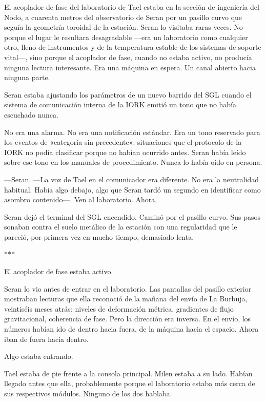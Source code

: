\documentclass[11pt,a5paper,twoside]{book}
\begin{document}
El acoplador de fase del laboratorio de Tael estaba en la sección de ingeniería del Nodo, a cuarenta metros del observatorio de Seran por un pasillo curvo que seguía la geometría toroidal de la estación. Seran lo visitaba raras veces. No porque el lugar le resultara desagradable —era un laboratorio como cualquier otro, lleno de instrumentos y de la temperatura estable de los sistemas de soporte vital—, sino porque el acoplador de fase, cuando no estaba activo, no producía ninguna lectura interesante. Era una máquina en espera. Un canal abierto hacia ninguna parte.

Seran estaba ajustando los parámetros de un nuevo barrido del SGL cuando el sistema de comunicación interna de la IORK emitió un tono que no había escuchado nunca.

No era una alarma. No era una notificación estándar. Era un tono reservado para los eventos de «categoría sin precedente»: situaciones que el protocolo de la IORK no podía clasificar porque no habían ocurrido antes. Seran había leído sobre ese tono en los manuales de procedimiento. Nunca lo había oído en persona.

—Seran. —La voz de Tael en el comunicador era diferente. No era la neutralidad habitual. Había algo debajo, algo que Seran tardó un segundo en identificar como asombro contenido—. Ven al laboratorio. Ahora.

Seran dejó el terminal del SGL encendido. Caminó por el pasillo curvo. Sus pasos sonaban contra el suelo metálico de la estación con una regularidad que le pareció, por primera vez en mucho tiempo, demasiado lenta.

\vspace{1.5em}
\begin{center}$\ast$\quad$\ast$\quad$\ast$\end{center}
\vspace{1.5em}

El acoplador de fase estaba activo.

Seran lo vio antes de entrar en el laboratorio. Las pantallas del pasillo exterior mostraban lecturas que ella reconoció de la mañana del envío de La Burbuja, veintiséis meses atrás: niveles de deformación métrica, gradientes de flujo gravitacional, coherencia de fase. Pero la dirección era inversa. En el envío, los números habían ido de dentro hacia fuera, de la máquina hacia el espacio. Ahora iban de fuera hacia dentro.

Algo estaba entrando.

Tael estaba de pie frente a la consola principal. Milen estaba a su lado. Habían llegado antes que ella, probablemente porque el laboratorio estaba más cerca de sus respectivos módulos. Ninguno de los dos hablaba.
\end{document}
